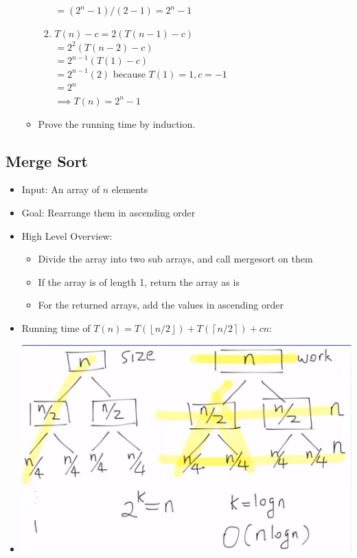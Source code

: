 \documentclass[12pt]{article}
\begin{document}
\begin{itemize}
\begin{itemize}
\begin{enumerate}
                $= (2^n - 1)/(2 - 1) = 2^n - 1$
            \item
                $T(n) - c = 2(T(n-1) - c)$ \\
                $= 2^2(T(n-2) - c)$ \\
                $= 2^{n-1}(T(1) - c)$ \\
                $= 2^{n-1}(2)$ because $T(1) = 1, c = -1$ \\
                $= 2^n$ \\
                $\implies T(n) = 2^n - 1$
        \end{enumerate}
        \item Prove the running time by induction.
    \end{itemize}
\end{itemize}

\subsection{Merge Sort}
\begin{itemize}
    \item Input: An array of $n$ elements
    \item Goal: Rearrange them in ascending order
    \item High Level Overview:
    \begin{itemize}
        \item Divide the array into two sub arrays, and call mergesort on them
        \item If the array is of length 1, return the array as is
        \item For the returned arrays, add the values in ascending order
    \end{itemize}
    \item Running time of $T(n) = T(\left\lfloor n/2 \right\rfloor) + T(\left\lceil n/2 \right\rceil) + cn$:
    \item[] \includegraphics[width=\textwidth]{images/merge-sort-tree.png}
\end{itemize}
\end{document}
